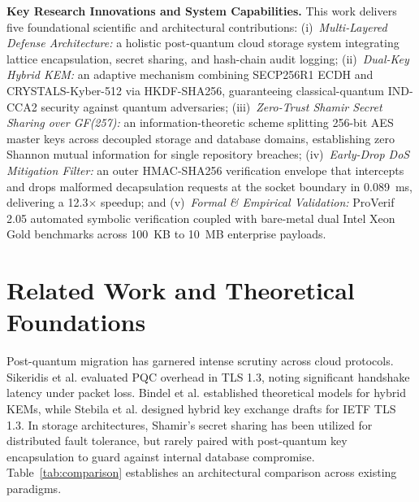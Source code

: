 \documentclass{llncs}
\begin{document}
\noindent\textbf{Key Research Innovations and System Capabilities.} This work delivers five foundational scientific and architectural contributions: (i)~\emph{Multi-Layered Defense Architecture:} a holistic post-quantum cloud storage system integrating lattice encapsulation, secret sharing, and hash-chain audit logging; (ii)~\emph{Dual-Key Hybrid KEM:} an adaptive mechanism combining SECP256R1 ECDH and CRYSTALS-Kyber-512 via HKDF-SHA256, guaranteeing classical-quantum IND-CCA2 security against quantum adversaries; (iii)~\emph{Zero-Trust Shamir Secret Sharing over GF(257):} an information-theoretic scheme splitting 256-bit AES master keys across decoupled storage and database domains, establishing zero Shannon mutual information for single repository breaches; (iv)~\emph{Early-Drop DoS Mitigation Filter:} an outer HMAC-SHA256 verification envelope that intercepts and drops malformed decapsulation requests at the socket boundary in 0.089~ms, delivering a 12.3$\times$ speedup; and (v)~\emph{Formal \& Empirical Validation:} ProVerif 2.05 automated symbolic verification coupled with bare-metal dual Intel Xeon Gold benchmarks across 100~KB to 10~MB enterprise payloads.

\section{Related Work and Theoretical Foundations}
Post-quantum migration has garnered intense scrutiny across cloud protocols. Sikeridis et al. \cite{sikeridis2020assessing} evaluated PQC overhead in TLS 1.3, noting significant handshake latency under packet loss. Bindel et al. \cite{bindel2019hybrid} established theoretical models for hybrid KEMs, while Stebila et al. \cite{stebila2023hybrid,stebila2016post} designed hybrid key exchange drafts for IETF TLS 1.3. In storage architectures, Shamir's secret sharing \cite{shamir1979share} has been utilized for distributed fault tolerance, but rarely paired with post-quantum key encapsulation to guard against internal database compromise. Table~\ref{tab:comparison} establishes an architectural comparison across existing paradigms.
\end{document}
